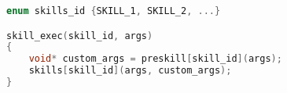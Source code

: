 \begin{lstlisting}[language=c, frame=single, caption={Pseudocode de la version de skill\_exec avec les "pre-pouvoirs"}]
enum skills_id {SKILL_1, SKILL_2, ...}

skill_exec(skill_id, args)
{
    void* custom_args = preskill[skill_id](args);
    skills[skill_id](args, custom_args);
}
\end{lstlisting}




